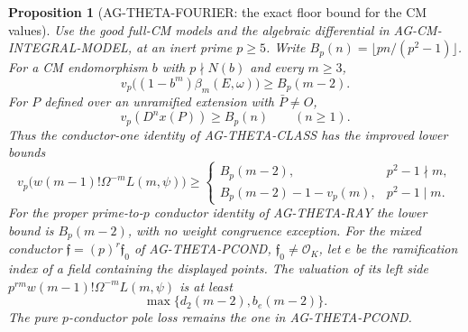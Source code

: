 \documentclass[11pt,a4paper]{article}
\newtheorem{proposition}{Proposition}
\begin{document}
\begin{proposition}[AG-THETA-FOURIER: the exact floor bound for the CM values]
Use the good full-CM models and the algebraic differential in
AG-CM-INTEGRAL-MODEL, at an inert prime $p\geq5$.  Write
$B_p(n)=\lfloor pn/(p^2-1)\rfloor$.
For a CM endomorphism $b$ with $p\nmid N(b)$ and every $m\geq3$,
\[
 v_p\bigl((1-b^m)\beta_m(E,\omega)\bigr)\geq B_p(m-2).
                                                               \tag{AG-Fourier-BH}
\]
For $P$ defined over an unramified extension with $\bar P\ne O$,
\[
                  v_p(D^n x(P))\geq B_p(n)\qquad(n\geq1).   \tag{AG-Fourier-point}
\]
Thus the conductor-one identity of AG-THETA-CLASS has the improved
lower bounds
\[
 v_p\bigl(w(m-1)!\Omega^{-m}L(m,\psi)\bigr)\geq
 \begin{cases}
 B_p(m-2),&p^2-1\nmid m,\\
 B_p(m-2)-1-v_p(m),&p^2-1\mid m.
 \end{cases}                                               \tag{AG-Fourier-class}
\]
For the proper prime-to-$p$ conductor identity of AG-THETA-RAY the
lower bound is $B_p(m-2)$, with no weight congruence exception.
For the mixed conductor $\mathfrak f=(p)^r\mathfrak f_0$ of
AG-THETA-PCOND, $\mathfrak f_0\ne\mathcal O_K$, let $e$ be the
ramification index of a field containing the displayed points.  The
valuation of its left side
$p^{rm}w(m-1)!\Omega^{-m}L(m,\psi)$ is at least
\[
                         \max\{d_2(m-2),b_e(m-2)\}.         \tag{AG-Fourier-mixed}
\]
The pure $p$-conductor pole loss remains the one in AG-THETA-PCOND.
\end{proposition}
\end{document}
